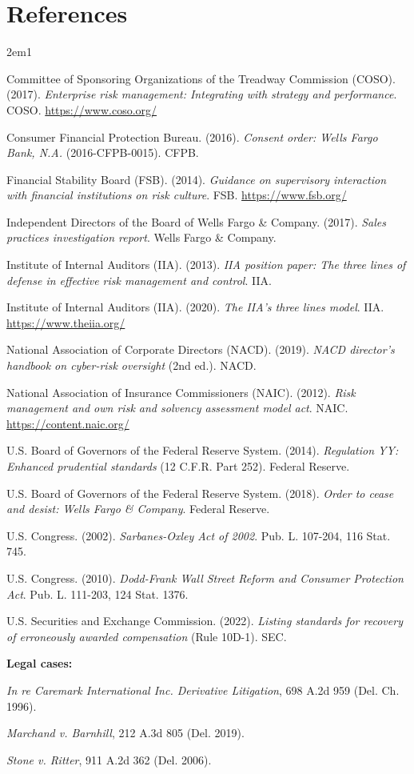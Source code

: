 \documentclass[11pt,openany]{book}
\begin{document}
\section*{References}
\begingroup
\sloppy
\begin{hangparas}{2em}{1}

Committee of Sponsoring Organizations of the Treadway Commission (COSO).
(2017). \emph{Enterprise risk management: Integrating with strategy and
performance}. COSO. \url{https://www.coso.org/}

Consumer Financial Protection Bureau. (2016). \emph{Consent order: Wells
Fargo Bank, N.A.} (2016-CFPB-0015). CFPB.

Financial Stability Board (FSB). (2014). \emph{Guidance on supervisory
interaction with financial institutions on risk culture}. FSB.
\url{https://www.fsb.org/}

Independent Directors of the Board of Wells Fargo \& Company. (2017).
\emph{Sales practices investigation report}. Wells Fargo \& Company.

Institute of Internal Auditors (IIA). (2013). \emph{IIA position paper: The
three lines of defense in effective risk management and control}. IIA.

Institute of Internal Auditors (IIA). (2020). \emph{The IIA's three lines
model}. IIA. \url{https://www.theiia.org/}

National Association of Corporate Directors (NACD). (2019). \emph{NACD
director's handbook on cyber-risk oversight} (2nd ed.). NACD.

National Association of Insurance Commissioners (NAIC). (2012). \emph{Risk
management and own risk and solvency assessment model act}. NAIC.
\url{https://content.naic.org/}

U.S. Board of Governors of the Federal Reserve System. (2014).
\emph{Regulation YY: Enhanced prudential standards} (12 C.F.R. Part 252).
Federal Reserve.

U.S. Board of Governors of the Federal Reserve System. (2018). \emph{Order
to cease and desist: Wells Fargo \& Company}. Federal Reserve.

U.S. Congress. (2002). \emph{Sarbanes-Oxley Act of 2002}. Pub. L. 107-204,
116 Stat. 745.

U.S. Congress. (2010). \emph{Dodd-Frank Wall Street Reform and Consumer
Protection Act}. Pub. L. 111-203, 124 Stat. 1376.

U.S. Securities and Exchange Commission. (2022). \emph{Listing standards for
recovery of erroneously awarded compensation} (Rule 10D-1). SEC.

\textbf{Legal cases:}

\emph{In re Caremark International Inc. Derivative Litigation}, 698 A.2d 959
(Del. Ch. 1996).

\emph{Marchand v. Barnhill}, 212 A.3d 805 (Del. 2019).

\emph{Stone v. Ritter}, 911 A.2d 362 (Del. 2006).

\end{hangparas}
\endgroup
\end{document}
